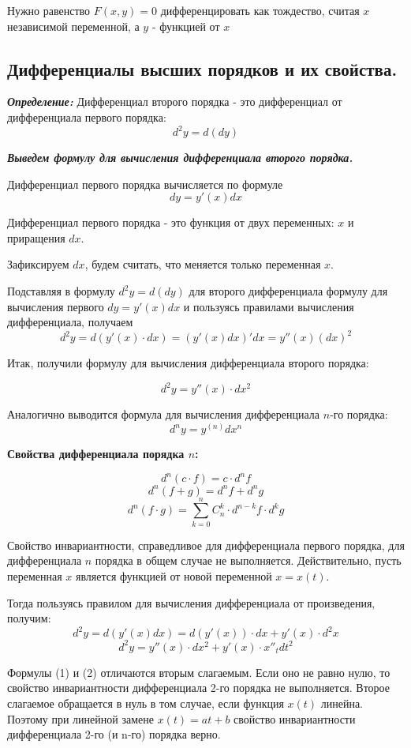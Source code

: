 \documentclass[a4paper,12pt]{article}
\theoremstyle{plain} %
\theoremstyle{definition} %
\theoremstyle{remark} %
\begin{document}
Нужно равенство $F(x, y) = 0$ дифференцировать как тождество, считая $x$ независимой переменной, а $y$ - функцией от $x$



\newpage
\subsection*{Дифференциалы высших порядков и их свойства.                                               }
\textit{\textbf{Определение:}} Дифференциал второго порядка - это дифференциал от дифференциала первого порядка:
\[
	d^2y = d(dy)
\]

\textbf{\textit{Выведем формулу для вычисления дифференциала второго порядка.}}

Дифференциал первого порядка вычисляется по формуле
\[
	dy = y'(x) dx
\]

Дифференциал первого порядка - это функция от двух переменных: $x$ и приращения $dx$.

Зафиксируем $dx$, будем считать, что меняется только переменная $x$.

Подставляя в формулу $d^2y = d(dy)$ для второго дифференциала формулу для вычисления первого $dy = y'(x)dx$ и пользуясь правилами вычисления дифференциала, получаем
\[
	d^2y = d(y'(x) \cdot dx) = (y'(x)dx)'dx = y''(x)(dx)^2
\]

Итак, получили формулу для вычисления дифференциала второго порядка:

\[
	d^2y = y''(x) \cdot dx^2
\]

Аналогично выводится формула для вычисления дифференциала $n$-го порядка:
\[
	d^ny = y^{(n)}dx^n
\]

\textbf{Свойства дифференциала порядка $n$:}

\[
	d^n(c\cdot f) = c\cdot d^n f
\]
\[
	d^n(f + g) = d^nf + d^ng
\]
\[
	d^n(f\cdot g) = \sum_{k = 0}^n C_n^k \cdot d^{n-k}f \cdot d^k g
\]

Свойство инвариантности, справедливое для дифференциала первого порядка, для дифференциала $n$ порядка в общем случае не выполняется. Действительно, пусть переменная $x$ является функцией от новой переменной $x = x(t)$.

Тогда пользуясь правилом для вычисления дифференциала от произведения, получим:
\[
	d^2y = d(y'(x)dx) = d(y'(x)) \cdot dx + y'(x) \cdot d^2x
\]
\[
	d^2y = y''(x) \cdot dx^2 + y'(x) \cdot x''_t dt^2
\]

Формулы (1) и (2) отличаются вторым слагаемым. Если оно не равно нулю, то свойство инвариантности дифференциала 2-го порядка не выполняется. Второе слагаемое обращается в нуль в том случае, если функция $x(t)$ линейна. Поэтому при линейной замене $x(t) = at + b$ свойство инвариантности дифференциала 2-го (и n-го) порядка верно.
\end{document}
